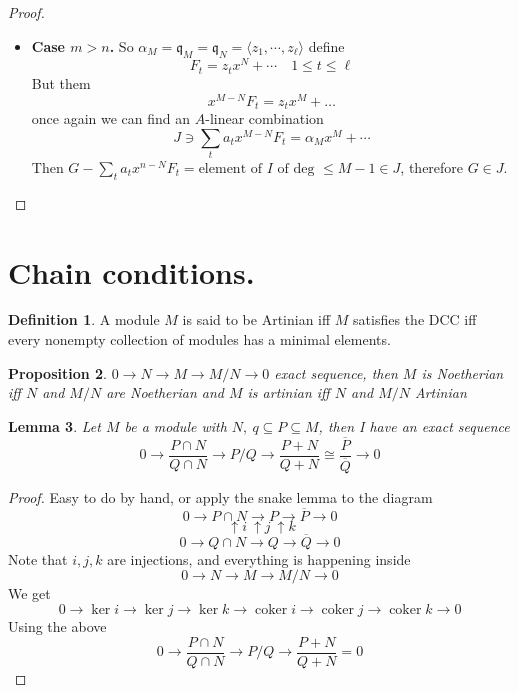 \documentclass[11pt,a4paper]{article}
\theoremstyle{definition}
\newtheorem{definition}{Definition}[section]
\theoremstyle{plain}
\newtheorem{lemma}[definition]{Lemma}
\newtheorem{proposition}[definition]{Proposition}
\theoremstyle{remark}
\newcommand{\angles}[1]{\langle #1 \rangle}
\begin{document}
\begin{proof}
\begin{itemize}
\begin{itemize}
            \item \textbf{Case $m > n$.} So $\alpha_M = \mathfrak{q}_M  = \mathfrak{q}_N = \angles{z_1, \cdots, z_\ell}$ define 
            $$F_t = z_t x^N + \cdots \quad 1 \le t \le \ell$$
            But them 
            $$x^{M-N} F_t = z_t x^M + \dots$$
            once again we can find an $A$-linear combination 
            $$J \ni \sum_t a_t x^{M-N} F_t = \alpha_M x^M + \cdots$$
            Then $G - \sum_t a_t x^{n-N}F_t = \text{element of $I$ of deg $\le M-1$} \in J$, 
            therefore $G \in J$.
        \end{itemize}
    \end{itemize}
\end{proof}

\section{Chain conditions.}
\begin{definition}
    A module $M$ is said to be Artinian iff $M$ satisfies the DCC iff every nonempty collection of modules has a minimal elements.
\end{definition}

\begin{proposition}
    $0 \to N \to M \to M/N \to 0$ exact sequence, then $M$ is Noetherian iff $N$ and $M/N$ are Noetherian and 
    $M$ is artinian iff $N$ and $M/N$ Artinian
\end{proposition}

\begin{lemma}
    Let $M$ be a module with $N, \ q \subseteq P \subseteq M$, then I have an exact sequence 
    $$0\to \frac{P \cap N}{Q \cap N} \to P/Q \to \frac{P+N}{Q+N} \cong \frac{\overline{P}}{\overline{Q}} \to 0$$
\end{lemma}

\begin{proof}
    Easy to do by hand, or apply the snake lemma to the diagram 
    $$0 \to P \cap N \to P \to \overline{P} \to 0$$
    $$\ \uparrow i \ \uparrow j \ \uparrow k$$
    $$0 \to Q \cap N \to Q \to \overline{Q} \to 0$$
    Note that $i,j,k$ are injections, and everything is happening inside 
    $$0 \to N \to M \to M/N \to 0$$
    We get 
    $$0 \to \ker i \to \ker j \to \ker k \to \operatorname{coker} i \to \operatorname{coker} j \to \operatorname{coker} k \to 0$$
    Using the above 
    $$0 \to \frac{P \cap N}{Q \cap N} \to P/Q \to \frac{P + N}{Q + N}= 0$$ 
\end{proof}
\end{document}
